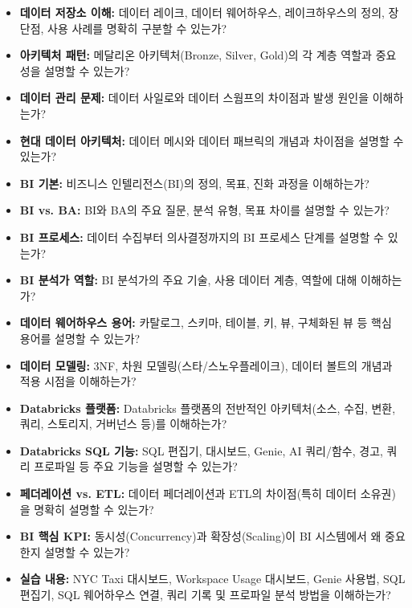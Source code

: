 \documentclass[11pt,a4paper]{article}
\begin{document}
\begin{tcolorbox}[mybox={학습 및 복습 체크리스트}]
\begin{itemize}
    \item \textbf{데이터 저장소 이해:} 데이터 레이크, 데이터 웨어하우스, 레이크하우스의 정의, 장단점, 사용 사례를 명확히 구분할 수 있는가?
    \item \textbf{아키텍처 패턴:} 메달리온 아키텍처(Bronze, Silver, Gold)의 각 계층 역할과 중요성을 설명할 수 있는가?
    \item \textbf{데이터 관리 문제:} 데이터 사일로와 데이터 스웜프의 차이점과 발생 원인을 이해하는가?
    \item \textbf{현대 데이터 아키텍처:} 데이터 메시와 데이터 패브릭의 개념과 차이점을 설명할 수 있는가?
    \item \textbf{BI 기본:} 비즈니스 인텔리전스(BI)의 정의, 목표, 진화 과정을 이해하는가?
    \item \textbf{BI vs. BA:} BI와 BA의 주요 질문, 분석 유형, 목표 차이를 설명할 수 있는가?
    \item \textbf{BI 프로세스:} 데이터 수집부터 의사결정까지의 BI 프로세스 단계를 설명할 수 있는가?
    \item \textbf{BI 분석가 역할:} BI 분석가의 주요 기술, 사용 데이터 계층, 역할에 대해 이해하는가?
    \item \textbf{데이터 웨어하우스 용어:} 카탈로그, 스키마, 테이블, 키, 뷰, 구체화된 뷰 등 핵심 용어를 설명할 수 있는가?
    \item \textbf{데이터 모델링:} 3NF, 차원 모델링(스타/스노우플레이크), 데이터 볼트의 개념과 적용 시점을 이해하는가?
    \item \textbf{Databricks 플랫폼:} Databricks 플랫폼의 전반적인 아키텍처(소스, 수집, 변환, 쿼리, 스토리지, 거버넌스 등)를 이해하는가?
    \item \textbf{Databricks SQL 기능:} SQL 편집기, 대시보드, Genie, AI 쿼리/함수, 경고, 쿼리 프로파일 등 주요 기능을 설명할 수 있는가?
    \item \textbf{페더레이션 vs. ETL:} 데이터 페더레이션과 ETL의 차이점(특히 데이터 소유권)을 명확히 설명할 수 있는가?
    \item \textbf{BI 핵심 KPI:} 동시성(Concurrency)과 확장성(Scaling)이 BI 시스템에서 왜 중요한지 설명할 수 있는가?
    \item \textbf{실습 내용:} NYC Taxi 대시보드, Workspace Usage 대시보드, Genie 사용법, SQL 편집기, SQL 웨어하우스 연결, 쿼리 기록 및 프로파일 분석 방법을 이해하는가?
\end{itemize}
\end{tcolorbox}
\end{document}
